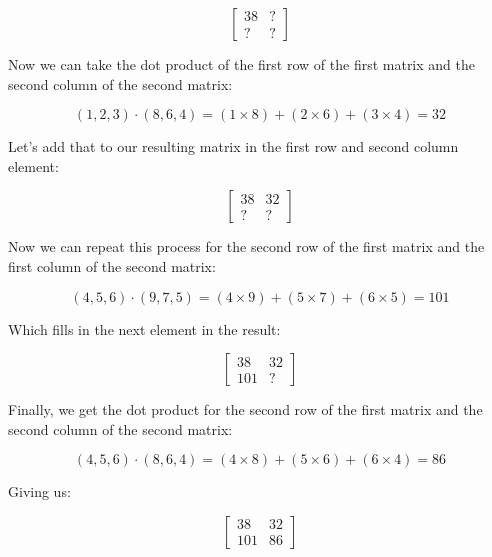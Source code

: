 \documentclass[11pt]{article}
\begin{document}
\begin{equation}\begin{bmatrix}38 & ?\\? & ?\end{bmatrix} \end{equation}

Now we can take the dot product of the first row of the first matrix and
the second column of the second matrix:

\begin{equation}(1,2,3) \cdot (8,6,4) = (1 \times 8) + (2 \times 6) + (3 \times 4) = 32\end{equation}

Let's add that to our resulting matrix in the first row and second
column element:

\begin{equation}\begin{bmatrix}38 & 32\\? & ?\end{bmatrix} \end{equation}

Now we can repeat this process for the second row of the first matrix
and the first column of the second matrix:

\begin{equation}(4,5,6) \cdot (9,7,5) = (4 \times 9) + (5 \times 7) + (6 \times 5) = 101\end{equation}

Which fills in the next element in the result:

\begin{equation}\begin{bmatrix}38 & 32\\101 & ?\end{bmatrix} \end{equation}

Finally, we get the dot product for the second row of the first matrix
and the second column of the second matrix:

\begin{equation}(4,5,6) \cdot (8,6,4) = (4 \times 8) + (5 \times 6) + (6 \times 4) = 86\end{equation}

Giving us:

\begin{equation}\begin{bmatrix}38 & 32\\101 & 86\end{bmatrix} \end{equation}
\end{document}
